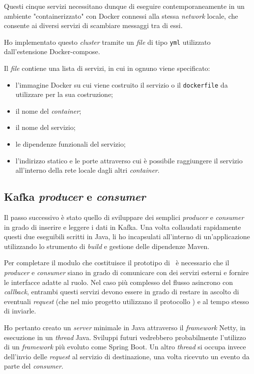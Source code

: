 Questi cinque servizi necessitano dunque di eseguire contemporaneamente in un ambiente "containerizzato" con Docker connessi alla stessa \textit{network} locale, che consente ai diversi servizi di scambiare messaggi tra di essi.

Ho implementato questo \textit{cluster} tramite un
\textit{file} di tipo \texttt{yml} utilizzato dall'estensione Docker-compose.

\noindent
Il \textit{file} contiene una lista di servizi, in cui in ognuno viene specificato:
\begin{itemize}
  \item l'immagine Docker su cui viene costruito il servizio o il \texttt{dockerfile} da utilizzare per la sua costruzione;
  \item il nome del \textit{container};
  \item il nome del servizio;
  \item le dipendenze funzionali del servizio;
  \item l'indirizzo  statico e le porte attraverso cui è possibile raggiungere il servizio all'interno della rete locale dagli altri \textit{container}.
\end{itemize}

\subsection{Kafka \textit{producer} e \textit{consumer}}

Il passo successivo è stato quello di sviluppare dei semplici \textit{producer} e \textit{consumer} in grado di inserire e leggere i dati in Kafka.
Una volta collaudati rapidamente questi due eseguibili scritti in Java, li ho incapsulati all'interno di un'applicazione utilizzando lo strumento di \textit{build} e gestione delle dipendenze Maven.

Per completare il modulo che costituisce il prototipo di \middleware\ è necessario che il \textit{producer} e \textit{consumer} siano in grado di comunicare con dei servizi esterni e fornire le interfacce adatte al ruolo.
Nel caso più complesso del flusso asincrono con \textit{callback}, entrambi questi servizi devono essere in grado di restare in ascolto di eventuali  \textit{request} (che nel mio progetto utilizzano il protocollo ) e al tempo stesso di inviarle.

Ho pertanto creato un  \textit{server} minimale in Java attraverso il \textit{framework} Netty, in esecuzione in un \textit{thread} Java.
Sviluppi futuri vedrebbero probabilmente l'utilizzo di un \textit{framework} più evoluto come Spring Boot.
Un altro \textit{thread} si occupa invece dell'invio delle  \textit{request} al servizio di destinazione, una volta ricevuto un evento da parte del \textit{consumer}.

